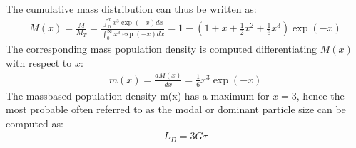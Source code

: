 \documentclass[letterpaper,10pt,english]{jupyterBook}
\begin{document}
\sphinxAtStartPar
The cumulative mass distribution can thus be written as:
\begin{equation}\label{equation:MSMPR_crystallizer:MSMPReq18}
\begin{split}
M(x)=\frac{M}{M_T}=\frac{\int_0^{x}x^3\exp(-x)dx}{\int_0^{\infty}x^3\exp(-x)dx}=1-\left(1+x+\frac{1}{2}x^2+\frac{1}{6}x^3\right)\exp(-x)
\end{split}
\end{equation}
\sphinxAtStartPar
The corresponding mass population density is computed differentiating \(M(x)\)with respect to \(x\):
\begin{equation}\label{equation:MSMPR_crystallizer:MSMPReq19}
\begin{split}
m(x)=\frac{dM(x)}{dx}=\frac{1}{6}x^3\exp(-x)
\end{split}
\end{equation}
\sphinxAtStartPar
The mass\sphinxhyphen{}based population density m(x) has a maximum for \(x=3\), hence the most probable \sphinxhyphen{} often referred to as the modal or dominant particle size can be computed as:
\begin{equation}\label{equation:MSMPR_crystallizer:MSMPReq20}
\begin{split}
L_D=3G\tau
\end{split}
\end{equation}
\end{document}

